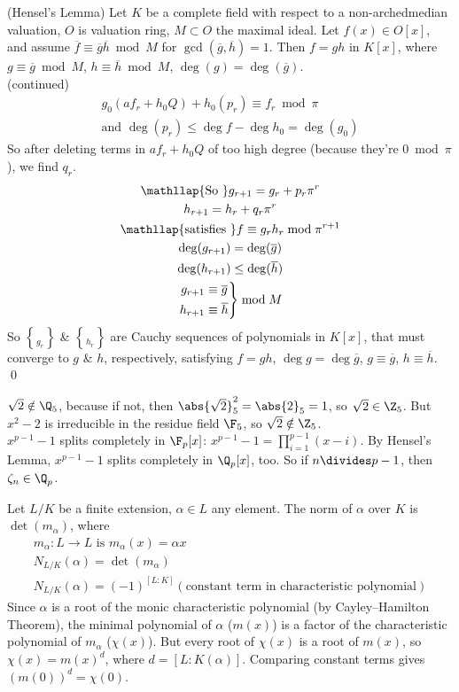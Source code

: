 \thm (Hensel's Lemma) Let $K$ be a complete field with respect to a non-archedmedian valuation, $O$ is valuation ring, $M\subset O$ the maximal ideal.  Let $f(x)\in O[x]$, and assume $\overline f\equiv\overline g\overline h\bmod M$ for $\gcd(\overline g,\overline h)=1$.  Then $f=gh$ in $K[x]$, where $g\equiv\overline g\bmod M$, $h\equiv\overline h\bmod M$, $\deg(g)=\deg(\overline g)$. \\
\pf (continued)
\begin{gather*}
g_0 (a f_r + h_0Q) + h_0(p_r) \equiv f_r \bmod \pi \\
\text{and } \deg(p_r)\leq\deg f-\deg h_0=\deg(g_0)
\end{gather*}
So after deleting terms in $af_r+h_0Q$ of too high degree (because they're $0\bmod\pi$), we find $q_r$.
\begin{gather*}
\mathllap{\text{So }} g_{r+1} = g_r + p_r \pi^r \\
h_{r+1} = h_r + q_r \pi^r \\
\mathllap{\text{satisfies }} f \equiv g_r h_r \bmod \pi^{r+1} \\
\deg(g_{r+1}) = \deg(\overline g) \\
\deg(h_{r+1}) \leq \deg(\overline h) \\
\left.\begin{aligned}
g_{r+1} &\equiv \overline g \\
h_{r+1} &\equiv \overline h
\end{aligned}\right\}\bmod M
\end{gather*}
So $\brace{g_r}$ \& $\brace{h_r}$ are Cauchy sequences of polynomials in $K[x]$, that must converge to $g$ \& $h$, respectively, satisfying $f=gh$, $\deg g=\deg\overline g$, $g\equiv\overline g$, $h\equiv\overline h$. \qed

\eg $\sqrt2\notin\Q_5$, because if not, then $\abs{\sqrt2}_5^2=\abs{2}_5=1$, so $\sqrt2\in\Z_5$.  But $x^2-2$ is irreducible in the residue field $\F_5$, so $\sqrt2\notin\Z_5$. \\
\eg $x^{p-1}-1$ splits completely in $\F_p[x]$: $x^{p-1}-1=\prod_{i=1}^{p-1}(x-i)$.  By Hensel's Lemma, $x^{p-1}-1$ splits completely in $\Q_p[x]$, too.  So if $n\divides p-1$, then $\zeta_n\in\Q_p$.

 Let $L/K$ be a finite extension, $\alpha\in L$ any element.  The norm of $\alpha$ over $K$ is $\det(m_\alpha)$, where
\begin{gather*}
m_\alpha\colon L\to L\text{ is }m_\alpha(x)=\alpha x \\
N_{L/K}(\alpha) = \det(m_\alpha) \\
N_{L/K}(\alpha) = (-1)^{[L:K]}(\text{constant term in characteristic polynomial})
\end{gather*}
Since $\alpha$ is a root of the monic characteristic polynomial (by Cayley--Hamilton Theorem), the minimal polynomial of $\alpha$ ($m(x)$) is a factor of the characteristic polynomial of $m_\alpha$ ($\chi(x)$).  But every root of $\chi(x)$ is a root of $m(x)$, so $\chi(x)=m(x)^d$, where $d=[L:K(\alpha)]$.  Comparing constant terms gives %
$(m(0))^d=\chi(0)$.

